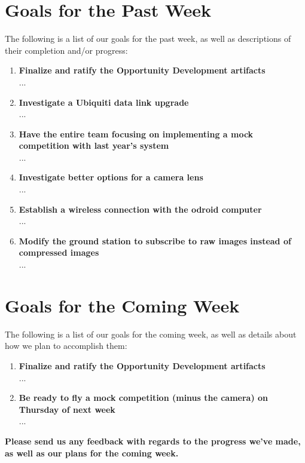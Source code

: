 \documentclass[]{../auvsi_doc}
\begin{document}
\section{Goals for the Past Week}

The following is a list of our goals for the past week, as well as descriptions of their completion and/or progress:

\begin{enumerate}
\item \textbf{Finalize and ratify the Opportunity Development artifacts}\\
...
\item \textbf{Investigate a Ubiquiti data link upgrade}\\
...
\item \textbf{Have the entire team focusing on implementing a mock competition with last year's system}\\
...
\item \textbf{Investigate better options for a camera lens}\\
...
\item \textbf{Establish a wireless connection with the odroid computer}\\
...
\item \textbf{Modify the ground station to subscribe to raw images instead of compressed images}\\
...
\end{enumerate}

\section{Goals for the Coming Week}

The following is a list of our goals for the coming week, as well as details about how we plan to accomplish them:

\begin{enumerate}
\item \textbf{Finalize and ratify the Opportunity Development artifacts}\\
...
\item \textbf{Be ready to fly a mock competition (minus the camera) on Thursday of next week}\\
...
\end{enumerate}

\textbf{Please send us any feedback with regards to the progress we've made, as well as our plans for the coming week.}
\end{document}
